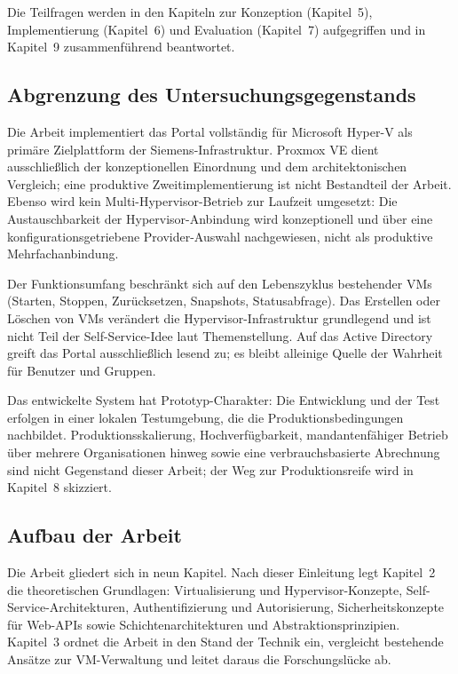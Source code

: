 \documentclass[12pt,a4paper]{article}
\begin{document}
Die Teilfragen werden in den Kapiteln zur Konzeption (Kapitel~5), Implementierung (Kapitel~6) und Evaluation (Kapitel~7) aufgegriffen und in Kapitel~9 zusammenführend beantwortet.

\subsection{Abgrenzung des Untersuchungsgegenstands}

Die Arbeit implementiert das Portal vollständig für Microsoft Hyper-V als primäre Zielplattform der Siemens-Infrastruktur. Proxmox VE dient ausschließlich der konzeptionellen Einordnung und dem architektonischen Vergleich; eine produktive Zweitimplementierung ist nicht Bestandteil der Arbeit. Ebenso wird kein Multi-Hypervisor-Betrieb zur Laufzeit umgesetzt: Die Austauschbarkeit der Hypervisor-Anbindung wird konzeptionell und über eine konfigurationsgetriebene Provider-Auswahl nachgewiesen, nicht als produktive Mehrfachanbindung.

Der Funktionsumfang beschränkt sich auf den Lebenszyklus bestehender VMs (Starten, Stoppen, Zurücksetzen, Snapshots, Statusabfrage). Das Erstellen oder Löschen von VMs verändert die Hypervisor-Infrastruktur grundlegend und ist nicht Teil der Self-Service-Idee laut Themenstellung. Auf das Active Directory greift das Portal ausschließlich lesend zu; es bleibt alleinige Quelle der Wahrheit für Benutzer und Gruppen.

Das entwickelte System hat Prototyp-Charakter: Die Entwicklung und der Test erfolgen in einer lokalen Testumgebung, die die Produktionsbedingungen nachbildet. Produktionsskalierung, Hochverfügbarkeit, mandantenfähiger Betrieb über mehrere Organisationen hinweg sowie eine verbrauchsbasierte Abrechnung sind nicht Gegenstand dieser Arbeit; der Weg zur Produktionsreife wird in Kapitel~8 skizziert.

\subsection{Aufbau der Arbeit}

Die Arbeit gliedert sich in neun Kapitel. Nach dieser Einleitung legt Kapitel~2 die theoretischen Grundlagen: Virtualisierung und Hypervisor-Konzepte, Self-Service-Architekturen, Authentifizierung und Autorisierung, Sicherheitskonzepte für Web-APIs sowie Schichtenarchitekturen und Abstraktionsprinzipien. Kapitel~3 ordnet die Arbeit in den Stand der Technik ein, vergleicht bestehende Ansätze zur VM-Verwaltung und leitet daraus die Forschungslücke ab.
\end{document}
